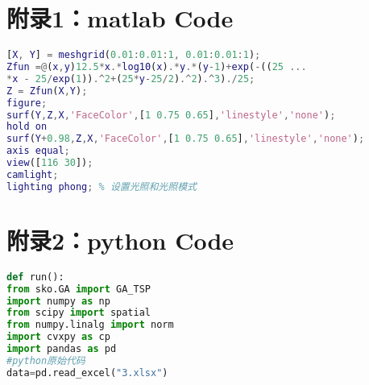 \newpage
\section{附录1：matlab Code}
\begin{lstlisting}[language=matlab]
[X, Y] = meshgrid(0.01:0.01:1, 0.01:0.01:1); 
Zfun =@(x,y)12.5*x.*log10(x).*y.*(y-1)+exp(-((25 ... 
*x - 25/exp(1)).^2+(25*y-25/2).^2).^3)./25; 
Z = Zfun(X,Y); 
figure; 
surf(Y,Z,X,'FaceColor',[1 0.75 0.65],'linestyle','none'); 
hold on 
surf(Y+0.98,Z,X,'FaceColor',[1 0.75 0.65],'linestyle','none'); 
axis equal; 
view([116 30]); 
camlight; 
lighting phong; % 设置光照和光照模式
\end{lstlisting}

\section{附录2：python Code}
\begin{lstlisting}[language=python]
def run():
from sko.GA import GA_TSP
import numpy as np
from scipy import spatial
from numpy.linalg import norm
import cvxpy as cp
import pandas as pd 
#python原始代码
data=pd.read_excel("3.xlsx")
\end{lstlisting}
